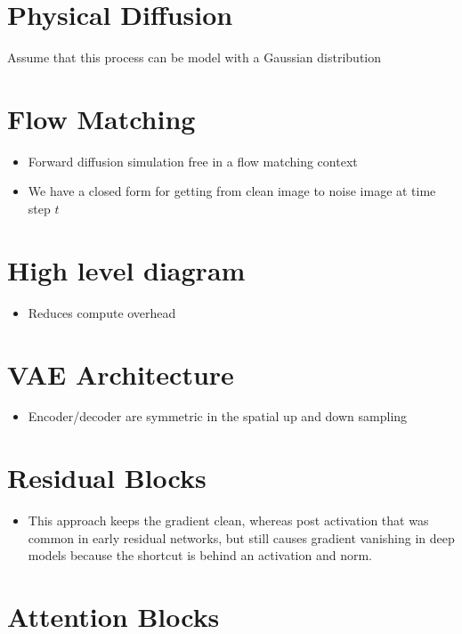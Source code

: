 \documentclass{article}
\begin{document}
\section*{Physical Diffusion}

Assume that this process can be model with a Gaussian distribution

\section*{Flow Matching}

\begin{itemize}
    \item Forward diffusion simulation free in a flow matching context
    \item We have a closed form for getting from clean image to noise image at time step $t$
\end{itemize}

\section*{High level diagram}

\begin{itemize}
    \item Reduces compute overhead
\end{itemize}

\section*{VAE Architecture}

\begin{itemize}
    \item Encoder/decoder are symmetric in the spatial up and down sampling
\end{itemize}

\section*{Residual Blocks}

\begin{itemize}
    \item This approach keeps the gradient clean, whereas post activation that was common in early residual networks, but still causes gradient vanishing in deep models because the shortcut is behind an activation and norm.
\end{itemize}

\section*{Attention Blocks}
\end{document}
